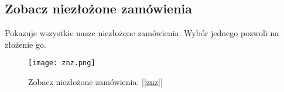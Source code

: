 \subsection{Zobacz niezłożone zamówienia}
Pokazuje wszystkie nasze niezłożone zamówienia. Wybór jednego pozwoli na złożenie go.
\label{znz}
\begin{figure}
  \centering
  \texttt{[image: znz.png]}
  \caption{Zobacz niezłożone zamówienia: [\ref{znz}]}
  \label{znzI}
\end{figure}

